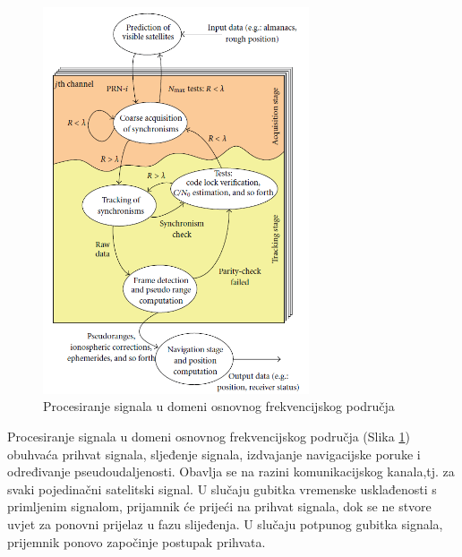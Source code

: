 \documentclass[a4paper,twoside,12pt]{memoir} %
\begin{document}
\begin{figure}[H]
	\centering
	\includegraphics[width=0.7\textwidth]{prihvatSignala}
	\caption{Procesiranje signala u domeni osnovnog frekvencijskog područja}
	\label{Fig:prihvat}	
\end{figure}

Procesiranje signala u domeni osnovnog frekvencijskog područja (Slika \ref{Fig:prihvat}) obuhvaća prihvat
signala, sljeđenje signala, izdvajanje navigacijske poruke i određivanje pseudoudaljenosti. Obavlja se
na razini komunikacijskog kanala,tj. za svaki pojedinačni satelitski signal. U slučaju gubitka
vremenske usklađenosti s primljenim signalom, prijamnik će prijeći na prihvat signala, dok se ne
stvore uvjet za ponovni prijelaz u fazu slijeđenja. U slučaju potpunog gubitka signala, prijemnik ponovo započinje postupak prihvata.
\end{document}
